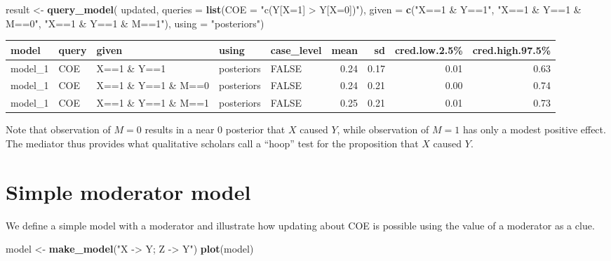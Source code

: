 \documentclass[
  12pt,
]{book}
\newenvironment{Shaded}{\begin{snugshade}}{\end{snugshade}}
\newcommand{\AttributeTok}[1]{\textcolor[rgb]{0.13,0.29,0.53}{#1}}
\newcommand{\FunctionTok}[1]{\textcolor[rgb]{0.13,0.29,0.53}{\textbf{#1}}}
\newcommand{\NormalTok}[1]{#1}
\newcommand{\OtherTok}[1]{\textcolor[rgb]{0.56,0.35,0.01}{#1}}
\newcommand{\StringTok}[1]{\textcolor[rgb]{0.31,0.60,0.02}{#1}}
\begin{document}
\begin{Shaded}
\begin{Highlighting}[]
\NormalTok{result }\OtherTok{\textless{}{-}} \FunctionTok{query\_model}\NormalTok{(}
\NormalTok{    updated, }
    \AttributeTok{queries =} \FunctionTok{list}\NormalTok{(}\AttributeTok{COE =} \StringTok{"c(Y[X=1] \textgreater{} Y[X=0])"}\NormalTok{), }
    \AttributeTok{given =} \FunctionTok{c}\NormalTok{(}\StringTok{"X==1 \& Y==1"}\NormalTok{, }\StringTok{"X==1 \& Y==1 \& M==0"}\NormalTok{, }\StringTok{"X==1 \& Y==1 \& M==1"}\NormalTok{),}
    \AttributeTok{using =} \StringTok{"posteriors"}\NormalTok{)}
\end{Highlighting}
\end{Shaded}

\begin{tabular}{l|l|l|l|l|r|r|r|r}
\hline
model & query & given & using & case\_level & mean & sd & cred.low.2.5\% & cred.high.97.5\%\\
\hline
model\_1 & COE & X==1 \& Y==1 & posteriors & FALSE & 0.24 & 0.17 & 0.01 & 0.63\\
\hline
model\_1 & COE & X==1 \& Y==1 \& M==0 & posteriors & FALSE & 0.24 & 0.21 & 0.00 & 0.74\\
\hline
model\_1 & COE & X==1 \& Y==1 \& M==1 & posteriors & FALSE & 0.25 & 0.21 & 0.01 & 0.73\\
\hline
\end{tabular}

Note that observation of \(M=0\) results in a near 0 posterior that \(X\) caused \(Y\), while observation of \(M=1\) has only a modest positive effect. The mediator thus provides what qualitative scholars call a ``hoop'' test for the proposition that \(X\) caused \(Y\).

\hypertarget{simple-moderator-model}{%
\section{Simple moderator model}\label{simple-moderator-model}}

We define a simple model with a moderator and illustrate how updating about COE is possible using the value of a moderator as a clue.

\begin{Shaded}
\begin{Highlighting}[]
\NormalTok{model }\OtherTok{\textless{}{-}} \FunctionTok{make\_model}\NormalTok{(}\StringTok{"X {-}\textgreater{} Y; Z {-}\textgreater{} Y"}\NormalTok{) }
\FunctionTok{plot}\NormalTok{(model)}
\end{Highlighting}
\end{Shaded}
\end{document}
